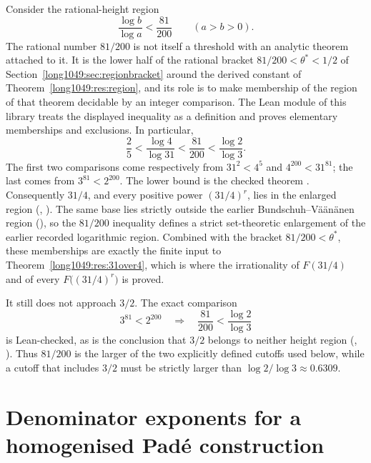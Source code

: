 \documentclass[11pt]{article}
\begin{document}
Consider the rational-height region
\[
 \frac{\log b}{\log a}<\frac{81}{200}
 \qquad(a>b>0).
\]
The rational number $81/200$ is not itself a threshold with an analytic theorem
attached to it.  It is the lower half of the rational bracket
$81/200<\theta^{*}<1/2$ of Section~\ref{long1049:sec:regionbracket} around the derived
constant of Theorem~\ref{long1049:res:region}, and its role is to make membership of the
region of that theorem decidable by an integer comparison.  The Lean module of
this library treats the displayed inequality as a definition and proves
elementary memberships and exclusions.  In particular,
\[
 \frac25
 <\frac{\log4}{\log31}
 <\frac{81}{200}
 <\frac{\log2}{\log3}.
\]
The first two comparisons come respectively from $31^2<4^5$ and
$4^{200}<31^{81}$; the last comes from $3^{81}<2^{200}$.  The lower bound is
the checked theorem
.  Consequently $31/4$, and every positive power $(31/4)^r$, lies
in the enlarged region
(,
).
The same base lies strictly outside the earlier
Bundschuh--V\"a\"an\"anen region
(),
so the $81/200$ inequality defines a strict set-theoretic enlargement of the
earlier recorded logarithmic region.  Combined with the bracket
$81/200<\theta^{*}$, these memberships are exactly the finite input to
Theorem~\ref{long1049:res:31over4}, which is where the irrationality of $F(31/4)$ and of
every $F\bigl((31/4)^{r}\bigr)$ is proved.

It still does not approach $3/2$.  The exact comparison
\[
 3^{81}<2^{200}
 \quad\Longrightarrow\quad
 \frac{81}{200}<\frac{\log2}{\log3}
\]
is Lean-checked, as is the conclusion that $3/2$ belongs to neither height
region
(,
).
Thus $81/200$ is the larger of the two explicitly defined cutoffs used below,
while a cutoff that includes $3/2$ must be strictly larger than
$\log2/\log3\approx0.6309$.

\section{Denominator exponents for a homogenised Pad\'e
construction}\label{long1049:sec:pade}
\end{document}
